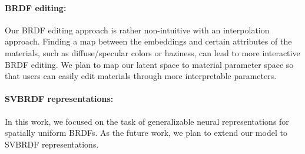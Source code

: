 \paragraph{BRDF editing:} Our BRDF editing approach is rather non-intuitive with an interpolation approach. Finding a map between the embeddings and certain attributes of the materials, such as diffuse/specular colors or haziness, can lead to more interactive BRDF editing. We plan to map our latent space to material parameter space so that users can easily edit materials through more interpretable parameters.

\paragraph{SVBRDF representations:} In this work, we focused on the task of generalizable neural representations for spatially uniform BRDFs. As the future work, we plan to extend our model to SVBRDF representations.

